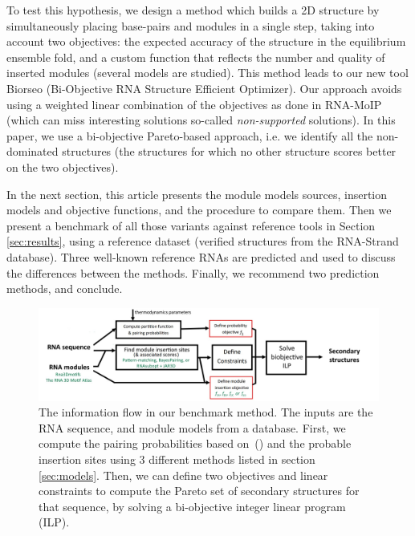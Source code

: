 \documentclass{bioinfo}
\begin{document}
To test this hypothesis, we design a method which builds a 2D structure by simultaneously placing base-pairs and modules in a single step, taking into account two objectives: the expected accuracy of the structure in the equilibrium ensemble fold, and a custom function that reflects the number and quality of inserted modules (several models are studied). This method leads to our new tool Biorseo (Bi-Objective RNA Structure Efficient Optimizer). Our approach avoids using a weighted linear combination of the objectives as done in RNA-MoIP (which can miss interesting solutions so-called \textit{non-supported} solutions). In this paper, we use a bi-objective Pareto-based approach, i.e. we identify all the non-dominated structures (the structures for which no other structure scores better on the two objectives).

In the next section, this article presents the module models sources, insertion models and objective functions, and the procedure to compare them. Then we present a benchmark of all those variants against reference tools in Section \ref{sec:results}, using a reference dataset (verified structures from the RNA-Strand database). Three well-known reference RNAs are predicted and used to discuss the differences between the methods. %
Finally, we recommend two prediction methods, and conclude.

\begin{figure}[t]
   \includegraphics[width=\textwidth]{fig/graph_abstract.jpg} 
   \caption{The information flow in our benchmark method. The inputs are the RNA sequence, and module models from a database. First, we compute the pairing probabilities based on~(\citealp{dirksAlgorithmComputingNucleic2004}) and the probable insertion sites using 3 different methods listed in section \ref{sec:models}. Then, we can define two objectives and linear constraints to compute the Pareto set of secondary structures for that sequence, by solving a bi-objective integer linear program (ILP).}
   \label{fig:pipeline}
\end{figure}
\end{document}
